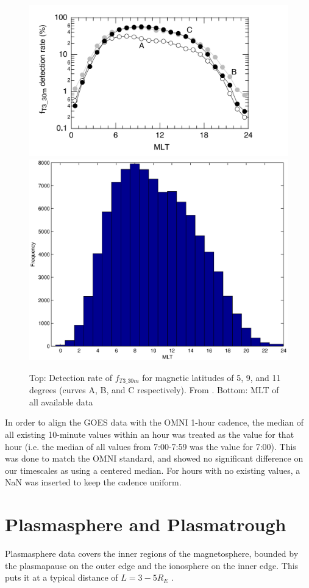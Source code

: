 \begin{figure}[htp!]
	\centering
	\includegraphics[width=0.8\linewidth]{Figures/Takahashi2010Availability.png}
	\includegraphics[width=0.8\linewidth]{Figures/databyMLT}
	\caption{Top: Detection rate of $f_{T3\_30m}$ for magnetic latitudes of 5, 9, and 11 degrees (curves A, B, and C respectively). From \citep{Takahashi2010SolarCycleVariation}. Bottom: MLT of all available data}
	\label{fig:Takahashi2010Availability}
\end{figure}


In order to align the GOES data with the OMNI 1-hour cadence, the median of all existing 10-minute values within an hour was treated as the value for that hour (i.e. the median of all values from 7:00-7:59 was the value for 7:00). This was done to match the OMNI standard, and showed no significant difference on our timescales as using a centered median. For hours with no existing values, a NaN was inserted to keep the cadence uniform. 

\section{Plasmasphere and Plasmatrough}
Plasmasphere data covers the inner regions of the magnetosphere, bounded by the plasmapause on the outer edge and the ionosphere on the inner edge. This puts it at a typical distance of $L=3-5R_E$ \citep{Carpenter1992ISEEModel}. 

